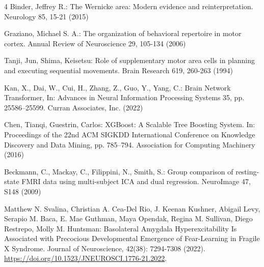 \documentclass[runningheads,a4paper]{llncs}
\begin{document}
\begin{thebibliography}{4}
 Binder, Jeffrey R.: The Wernicke area: Modern evidence and reinterpretation. Neurology 85, 15-21 (2015)

 Graziano, Michael S. A.: The organization of behavioral repertoire in motor cortex. Annual Review of Neuroscience 29, 105-134 (2006)

 Tanji, Jun, Shima, Keisetsu: Role of supplementary motor area cells in planning and executing sequential movements. Brain Research 619, 260-263 (1994)

 Kan, X., Dai, W., Cui, H., Zhang, Z., Guo, Y., Yang, C.: Brain Network Transformer, In: Advances in Neural Information Processing Systems 35, pp. 25586--25599. Curran Associates, Inc. (2022)

 Chen, Tianqi, Guestrin, Carlos: XGBoost: A Scalable Tree Boosting System. In: Proceedings of the 22nd ACM SIGKDD International Conference on Knowledge Discovery and Data Mining, pp. 785–794. Association for Computing Machinery (2016)

 Beckmann, C., Mackay, C., Filippini, N., Smith, S.: Group comparison of resting-state FMRI data using multi-subject ICA and dual regression. NeuroImage 47, S148 (2009)

 Matthew N. Svalina, Christian A. Cea-Del Rio, J. Keenan Kushner, Abigail Levy, Serapio M. Baca, E. Mae Guthman, Maya Opendak, Regina M. Sullivan, Diego Restrepo, Molly M. Huntsman: Basolateral Amygdala Hyperexcitability Is Associated with Precocious Developmental Emergence of Fear-Learning in Fragile X Syndrome. Journal of Neuroscience, 42(38): 7294-7308 (2022). \url{https://doi.org/10.1523/JNEUROSCI.1776-21.2022}.

\end{thebibliography}
\end{document}
